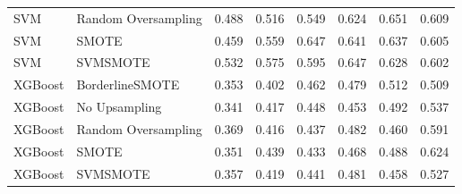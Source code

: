 \begin{tabular}{llllllll}
                         SVM & Random Oversampling & 0.488 &                     0.516 &                 0.549 &                  0.624 &                                   0.651 &     0.609 \\
                         SVM &               SMOTE & 0.459 &                     0.559 &                 0.647 &                  0.641 &                                   0.637 &     0.605 \\
                         SVM &            SVMSMOTE & 0.532 &                     0.575 &                 0.595 &                  0.647 &                                   0.628 &     0.602 \\
                     XGBoost &     BorderlineSMOTE & 0.353 &                     0.402 &                 0.462 &                  0.479 &                                   0.512 &     0.509 \\
                     XGBoost &       No Upsampling & 0.341 &                     0.417 &                 0.448 &                  0.453 &                                   0.492 &     0.537 \\
                     XGBoost & Random Oversampling & 0.369 &                     0.416 &                 0.437 &                  0.482 &                                   0.460 &     0.591 \\
                     XGBoost &               SMOTE & 0.351 &                     0.439 &                 0.433 &                  0.468 &                                   0.488 &     0.624 \\
                     XGBoost &            SVMSMOTE & 0.357 &                     0.419 &                 0.441 &                  0.481 &                                   0.458 &     0.527 \\
\bottomrule
\end{tabular}
